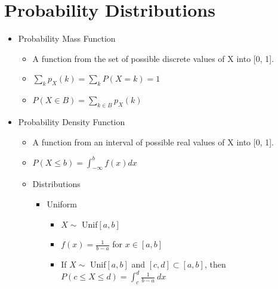 \documentclass{report}
\begin{document}
  \section{Probability Distributions}
    \begin{itemize}
      \item Probability Mass Function
        \begin{itemize}
          \item A function from the set of possible discrete values of X into [0, 1].
          \item $ \sum^{}_{k} p_X(k) = \sum^{}_{k}  P(X=k) = 1 $
          \item $ P(X \in B) =  \sum^{}_{k \in B} p_X(k) $
        \end{itemize}
      \item Probability Density Function
        \begin{itemize}
          \item A function from an interval of possible real values of X into [0, 1].
          \item $ P(X \leq b) =  \int^{b}_{-\infty} f(x) dx $
          \item Distributions
              \begin{itemize}
                \item Uniform
                    \begin{itemize}
                      \item $X \sim$ Unif$[a,b]$
                      \item $f(x) = \frac{1}{b-a} $ for $x \in [a,b]$
                      \item If $X \sim$ Unif$[a,b]$ and $[c,d] \subset [a,b]$, then
                        $ P(c \leq X \leq d) = \int_{{c}}^{{d}} {\frac{1}{b-a}} \: d{x} {} $
                    \end{itemize}
              \end{itemize}
        \end{itemize}
    \end{itemize}
\end{document}
